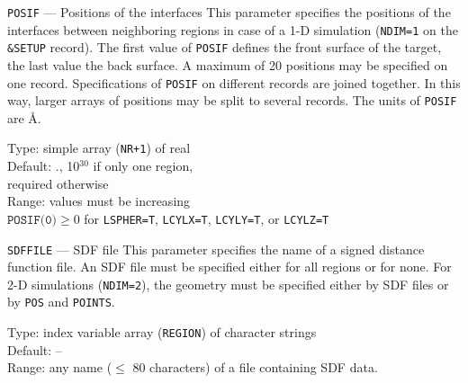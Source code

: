 \begin{keydescription}{\texttt{POSIF} --- Positions of the interfaces}
%
  This parameter specifies the positions of the interfaces between
  neighboring regions in case of a 1-D simulation (\texttt{NDIM=1} on
  the \texttt{\&SETUP} record). The first value of \texttt{POSIF}
  defines the front surface of the target, the last value the back
  surface.  A maximum of 20 positions may be specified on one record.
  Specifications of \texttt{POSIF} on different records are joined together.  In
  this way, larger arrays of positions may be split to several records.  The
  units of \texttt{POSIF} are \AA. 
  \begin{keytab}
    Type:    \> simple array (\texttt{NR+1}) of real \\
    Default: ., 10$^{30}$ if only one region, \\
             \> required otherwise \\
    Range:   \> values must be increasing \\
             \> $\texttt{POSIF(0)} \ge 0$ for \texttt{LSPHER=T}, 
                \texttt{LCYLX=T}, \texttt{LCYLY=T}, or \texttt{LCYLZ=T}
  \end{keytab}
\end{keydescription}

\begin{keydescription}{\texttt{SDFFILE} --- SDF file}
%
  This parameter specifies the name of a signed distance function file. 
  An SDF file must be specified either for all regions or for none. For
  2-D simulations (\texttt{NDIM=2}), the geometry must be specified
  either by SDF files or by \texttt{POS} and \texttt{POINTS}.
  \begin{keytab}
    Type:    \> index variable array (\texttt{REGION}) of character
                strings  \\
    Default: \> -- \\
    Range:   \> any name ($\le$ 80 characters) of a file containing 
                SDF data.
  \end{keytab}
\end{keydescription}

